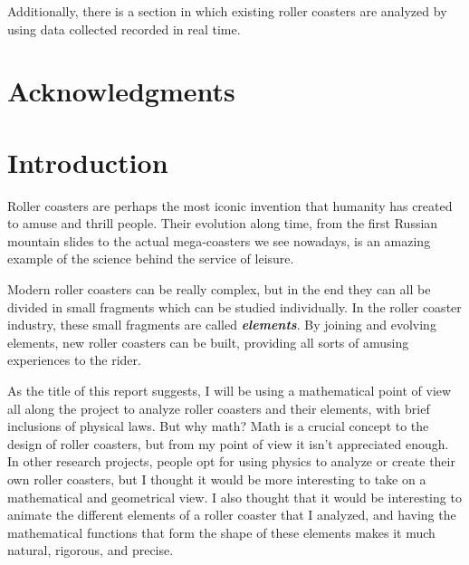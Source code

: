 \documentclass[12pt,twoside,a4paper]{article}
\begin{document}
		Additionally, there is a section in which existing roller coasters are analyzed by using data collected recorded in real time.
	
	\newpage
	
	\section*{Acknowledgments}
	
	
	
	\newpage
	
	\tableofcontents
	
	\newpage
		
	\listoffigures
	
	\cleardoublepage
	
	\section{Introduction}
	Roller coasters are perhaps the most iconic invention that humanity has created to amuse and thrill people. Their evolution along time, from the first Russian mountain slides to the actual mega-coasters we see nowadays, is an amazing example of the science behind the service of leisure.
	
	Modern roller coasters can be really complex, but in the end they can all be divided in small fragments which can be studied individually. In the roller coaster industry, these small fragments are called \textbf{\textit{elements}}. By joining and evolving elements, new roller coasters can be built, providing all sorts of amusing experiences to the rider.
	
	As the title of this report suggests, I will be using a mathematical point of view all along the project to analyze roller coasters and their elements, with brief inclusions of physical laws. But why math? Math is a crucial concept to the design of roller coasters, but from my point of view it isn't appreciated enough. In other research projects, people opt for using physics to analyze or create their own roller coasters, but I thought it would be more interesting to take on a mathematical and geometrical view. I also thought that it would be interesting to animate the different elements of a roller coaster that I analyzed, and having the mathematical functions that form the shape of these elements makes it much natural, rigorous, and precise.
	
\end{document}
